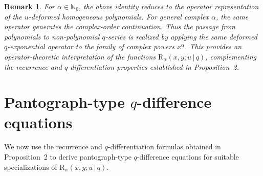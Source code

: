 \documentclass[12pt]{article}
\newcommand{\rr}{\mathrm{R}}
\newtheorem{remark}{Remark}
\begin{document}
\begin{remark}
For \(\alpha\in\mathbb N_0\), the above identity reduces to the operator representation of the \(u\)-deformed homogeneous polynomials. For general complex \(\alpha\), the same operator generates the complex-order continuation. Thus the passage from polynomials to non-polynomial \(q\)-series is realized by applying the same deformed \(q\)-exponential operator to the family of complex powers \(x^\alpha\). This provides an operator-theoretic interpretation of the functions \(\rr_\alpha(x,y;u\,|\,q)\), complementing the recurrence and \(q\)-differentiation properties established in Proposition~2.
\end{remark}

\section{Pantograph-type $q$-difference equations}

We now use the recurrence and \(q\)-differentiation formulas obtained in Proposition~2 to derive pantograph-type \(q\)-difference equations for suitable specializations of \(\rr_\alpha(x,y;u\,|\,q)\).
\end{document}
